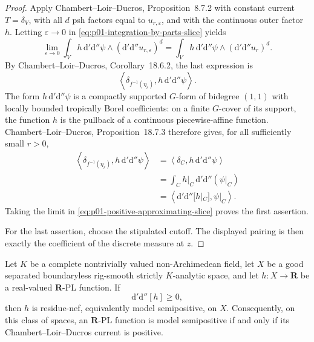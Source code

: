 \begin{proof}
Apply Chambert--Loir--Ducros, Proposition~8.7.2 with constant current
$T=\delta_V$, with all $d$ psh factors equal to
$u_{r,\varepsilon}$, and with the continuous outer factor $h$.  Letting
$\varepsilon\to0$ in \eqref{eq:p01-integration-by-parts-slice} yields
\[
\lim_{\varepsilon\to0}
\int_V h\,\mathrm d'\mathrm d''\psi\wedge
 (\mathrm d'\mathrm d''u_{r,\varepsilon})^d
=
\int_V h\,\mathrm d'\mathrm d''\psi\wedge
 (\mathrm d'\mathrm d''u_r)^d.
\]
By Chambert--Loir--Ducros, Corollary~18.6.2, the last expression is
\[
 \left\langle\delta_{f^{-1}(\eta_r)},
 h\,\mathrm d'\mathrm d''\psi\right\rangle.
\]
The form
$h\,\mathrm d'\mathrm d''\psi$ is a compactly supported $G$-form of
bidegree $(1,1)$ with locally bounded tropically Borel coefficients: on a
finite $G$-cover of its support, the function $h$ is the pullback of a
continuous piecewise-affine function.  Chambert--Loir--Ducros,
Proposition~18.7.3 therefore gives, for all sufficiently small $r>0$,
\begin{align*}
 \left\langle\delta_{f^{-1}(\eta_r)},
 h\,\mathrm d'\mathrm d''\psi\right\rangle
 &=
 \left\langle\delta_C,h\,\mathrm d'\mathrm d''\psi\right\rangle\\
 &=
 \int_C h|_C\,\mathrm d'\mathrm d''(\psi|_C)\\
 &=
 \left\langle\mathrm d'\mathrm d''[h|_C],\psi|_C\right\rangle.
\end{align*}
Taking the limit in \eqref{eq:p01-positive-approximating-slice} proves the
first assertion.

For the last assertion, choose the stipulated cutoff.  The displayed
pairing is then exactly the coefficient of the discrete measure at $z$.
\end{proof}

\begin{theorem}
\label{thm:p01-rigsmooth-current-converse-candidate}
Let $K$ be a complete nontrivially valued non-Archimedean field, let $X$ be
a good separated boundaryless rig-smooth strictly $K$-analytic space, and
let $h:X\to\mathbf R$ be a real-valued $\mathbf R$-PL function.  If
\[
                         \mathrm d'\mathrm d''[h]\geq0,
\]
then $h$ is residue-nef, equivalently model semipositive, on $X$.
Consequently, on this class of spaces, an $\mathbf R$-PL function is model
semipositive if and only if its Chambert--Loir--Ducros current is positive.
\end{theorem}

